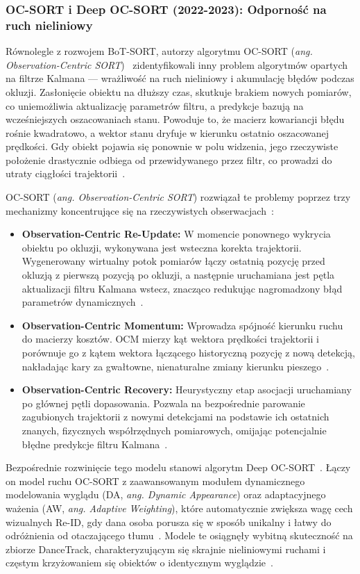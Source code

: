 \subsubsection{OC-SORT i Deep OC-SORT (2022-2023): Odporność na ruch nieliniowy}

Równolegle z rozwojem BoT-SORT, autorzy algorytmu OC-SORT (\textit{ang. Observation-Centric
  SORT})~\cite{cao2023ocsort} zidentyfikowali inny problem algorytmów opartych na filtrze Kalmana ---
wrażliwość na ruch nieliniowy i akumulację błędów podczas okluzji. Zasłonięcie obiektu na dłuższy
czas, skutkuje brakiem nowych pomiarów, co uniemożliwia aktualizację parametrów filtru, a predykcje
bazują na wcześniejszych oszacowaniach stanu. Powoduje to, że macierz kowariancji błędu rośnie
kwadratowo, a wektor stanu dryfuje w kierunku ostatnio oszacowanej prędkości. Gdy obiekt pojawia
się ponownie w polu widzenia, jego rzeczywiste położenie drastycznie odbiega od przewidywanego
przez filtr, co prowadzi do utraty ciągłości trajektorii~\cite{cao2023ocsort}.

OC-SORT (\textit{ang. Observation-Centric SORT}) rozwiązał te problemy poprzez trzy mechanizmy
koncentrujące się na rzeczywistych obserwacjach~\cite{cao2023ocsort}:
\begin{itemize}
  \item \textbf{Observation-Centric Re-Update:} W momencie ponownego wykrycia obiektu po okluzji, wykonywana jest wsteczna korekta trajektorii. Wygenerowany wirtualny potok pomiarów łączy ostatnią pozycję przed okluzją z pierwszą pozycją po okluzji, a następnie uruchamiana jest pętla aktualizacji filtru Kalmana wstecz, znacząco redukując nagromadzony błąd parametrów dynamicznych~\cite{cao2023ocsort}.
  \item \textbf{Observation-Centric Momentum:} Wprowadza spójność kierunku ruchu do macierzy kosztów. OCM mierzy kąt wektora prędkości trajektorii i porównuje go z kątem wektora łączącego historyczną pozycję z nową detekcją, nakładając kary za gwałtowne, nienaturalne zmiany kierunku pieszego~\cite{cao2023ocsort}.
  \item \textbf{Observation-Centric Recovery:} Heurystyczny etap asocjacji uruchamiany po głównej pętli dopasowania. Pozwala na bezpośrednie parowanie zagubionych trajektorii z nowymi detekcjami na podstawie ich ostatnich znanych, fizycznych współrzędnych pomiarowych, omijając potencjalnie błędne predykcje filtru Kalmana~\cite{cao2023ocsort}.
\end{itemize}

Bezpośrednie rozwinięcie tego modelu stanowi algorytm Deep OC-SORT~\cite{maggiolino2023deepocsort}.
Łączy on model ruchu OC-SORT z zaawansowanym modułem dynamicznego modelowania wyglądu (DA,
\textit{ang. Dynamic Appearance}) oraz adaptacyjnego ważenia (AW, \textit{ang. Adaptive
  Weighting}), które automatycznie zwiększa wagę cech wizualnych Re-ID, gdy dana osoba porusza się w
sposób unikalny i łatwy do odróżnienia od otaczającego tłumu~\cite{maggiolino2023deepocsort}.
Modele te osiągnęły wybitną skuteczność na zbiorze DanceTrack, charakteryzującym się skrajnie
nieliniowymi ruchami i częstym krzyżowaniem się obiektów o identycznym
wyglądzie~\cite{maggiolino2023deepocsort}.

